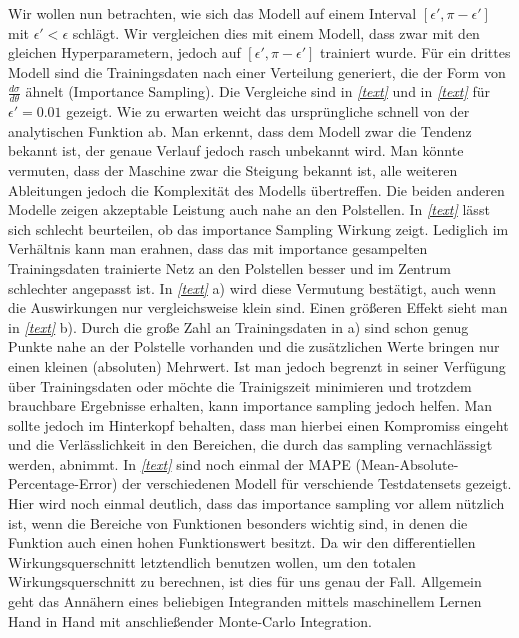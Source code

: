 Wir wollen nun betrachten, wie sich das Modell auf einem Interval $[\epsilon', \pi-\epsilon']$ mit $\epsilon' < \epsilon$ schlägt. Wir vergleichen dies mit einem Modell, dass zwar mit den gleichen Hyperparametern, jedoch auf $[\epsilon', \pi-\epsilon']$ trainiert wurde. Für ein drittes Modell sind die Trainingsdaten nach einer Verteilung generiert, die der Form von $\frac{d\sigma}{d\theta}$ ähnelt (Importance Sampling). Die Vergleiche sind in \textit{\autoref{text}} und in \textit{\autoref{text}} für $\epsilon' = 0.01$ gezeigt. Wie zu erwarten weicht das ursprüngliche schnell von der analytischen Funktion ab. Man erkennt, dass dem Modell zwar die Tendenz bekannt ist, der genaue Verlauf jedoch rasch unbekannt wird. Man könnte vermuten, dass der Maschine zwar die Steigung bekannt ist, alle weiteren Ableitungen jedoch die Komplexität des Modells übertreffen. Die beiden anderen Modelle zeigen akzeptable Leistung auch nahe an den Polstellen. In \textit{\autoref{text}} lässt sich schlecht beurteilen, ob das importance Sampling Wirkung zeigt. Lediglich im Verhältnis kann man erahnen, dass das mit importance gesampelten Trainingsdaten trainierte Netz an den Polstellen besser und im Zentrum schlechter angepasst ist. In \textit{\autoref{text}} a) wird diese Vermutung bestätigt, auch wenn die Auswirkungen nur vergleichsweise klein sind. Einen größeren Effekt sieht man in \textit{\autoref{text}} b). Durch die große Zahl an Trainingsdaten in a) sind schon genug Punkte nahe an der Polstelle vorhanden und die zusätzlichen Werte bringen nur einen kleinen (absoluten) Mehrwert. Ist man jedoch begrenzt in seiner Verfügung über Trainingsdaten oder möchte die Trainigszeit minimieren und trotzdem brauchbare Ergebnisse erhalten, kann importance sampling jedoch helfen. Man sollte jedoch im Hinterkopf behalten, dass man hierbei einen Kompromiss eingeht und die Verlässlichkeit in den Bereichen, die durch das sampling vernachlässigt werden, abnimmt. In \textit{\autoref{text}} sind noch einmal der MAPE (Mean-Absolute-Percentage-Error) der verschiedenen Modell für verschiende Testdatensets gezeigt. Hier wird noch einmal deutlich, dass das importance sampling vor allem nützlich ist, wenn die Bereiche von Funktionen besonders wichtig sind, in denen die Funktion auch einen hohen Funktionswert besitzt. Da wir den differentiellen Wirkungsquerschnitt letztendlich benutzen wollen, um den totalen Wirkungsquerschnitt zu berechnen, ist dies für uns genau der Fall. Allgemein geht das Annähern eines beliebigen Integranden mittels maschinellem Lernen Hand in Hand mit anschließender Monte-Carlo Integration. 
 


